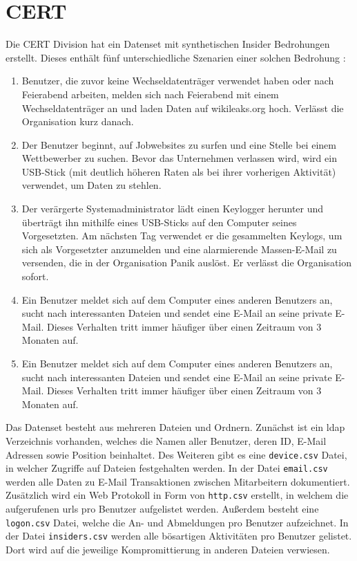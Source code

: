 \documentclass[
    12pt, %
    DIV10,
    ngerman, %
    a4paper, %
    oneside, %
    titlepage, %
    parskip=half, %
    headings=normal, %
    listof=totoc, %
    bibliography=totoc, %
    index=totoc, %
    captions=tableheading, %
    final %
]{scrreprt}
\begin{document}
\section{CERT}
Die CERT Division hat ein Datenset mit synthetischen Insider Bedrohungen erstellt. Dieses enthält fünf unterschiedliche Szenarien einer solchen Bedrohung \parencite{glasser2013bridging}:
\begin{enumerate}
\item Benutzer, die zuvor keine Wechseldatenträger verwendet haben oder nach Feierabend arbeiten, melden sich nach Feierabend mit einem Wechseldatenträger an und laden Daten auf wikileaks.org hoch. Verlässt die Organisation kurz danach.
\item Der Benutzer beginnt, auf Jobwebsites zu surfen und eine Stelle bei einem Wettbewerber zu suchen. Bevor das Unternehmen verlassen wird, wird ein USB-Stick (mit deutlich höheren Raten als bei ihrer vorherigen Aktivität) verwendet, um Daten zu stehlen.
\item Der verärgerte Systemadministrator lädt einen Keylogger herunter und überträgt ihn mithilfe eines USB-Sticks auf den Computer seines Vorgesetzten. Am nächsten Tag verwendet er die gesammelten Keylogs, um sich als Vorgesetzter anzumelden und eine alarmierende Massen-E-Mail zu versenden, die in der Organisation Panik auslöst. Er verlässt die Organisation sofort.
\item Ein Benutzer meldet sich auf dem Computer eines anderen Benutzers an, sucht nach interessanten Dateien und sendet eine E-Mail an seine private E-Mail. Dieses Verhalten tritt immer häufiger über einen Zeitraum von 3 Monaten auf.
\item Ein Benutzer meldet sich auf dem Computer eines anderen Benutzers an, sucht nach interessanten Dateien und sendet eine E-Mail an seine private E-Mail. Dieses Verhalten tritt immer häufiger über einen Zeitraum von 3 Monaten auf.
\end{enumerate}
Das Datenset besteht aus mehreren Dateien und Ordnern. Zunächst ist ein \ac{ldap} Verzeichnis vorhanden, welches die Namen aller Benutzer, deren ID, E-Mail Adressen sowie Position beinhaltet. Des Weiteren gibt es eine \texttt{device.csv} Datei, in welcher Zugriffe auf Dateien festgehalten werden. In der Datei \texttt{email.csv} werden alle Daten zu E-Mail Transaktionen zwischen Mitarbeitern dokumentiert. Zusätzlich wird ein Web Protokoll in Form von \texttt{http.csv} erstellt, in welchem die aufgerufenen \ac{urls} pro Benutzer aufgelistet werden. Au{\ss}erdem besteht eine \texttt{logon.csv} Datei, welche die An- und Abmeldungen pro Benutzer aufzeichnet. In der Datei \texttt{insiders.csv} werden alle bösartigen Aktivitäten pro Benutzer gelistet. Dort wird auf die jeweilige Kompromittierung in anderen Dateien verwiesen.
\end{document}

